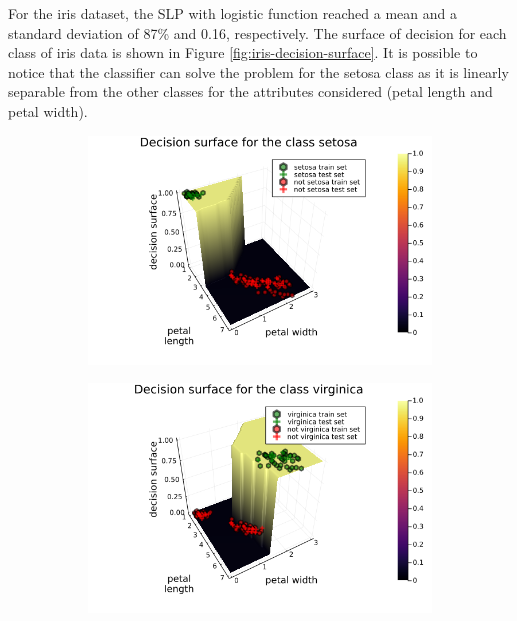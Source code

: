 \documentclass[12pt,a4paper]{article}
\begin{document}
For the iris dataset, the SLP with logistic function reached a mean and a standard deviation of 87\% and 0.16, respectively.  The surface of decision for each class of iris data is shown in Figure \ref{fig:iris-decision-surface}. It is possible to notice that the classifier can solve the problem for the setosa class as it is linearly separable from the other classes for the attributes considered (petal length and petal width).

\begin{figure}[H]
    \centering
    \begin{subfigure}{0.6\textwidth}
        \includegraphics[scale=.4]{../trab4 (single layer perceptron with sigmoidal functions)/figs/decision-surface-for-setosa.png}
    \end{subfigure}
\end{figure}    
\begin{figure}[H]\ContinuedFloat
    \centering
    \begin{subfigure}{0.6\textwidth}
        \includegraphics[scale=.4]{../trab4 (single layer perceptron with sigmoidal functions)/figs/decision-surface-for-virginica.png}
    \end{subfigure}
\end{figure}
\end{document}
